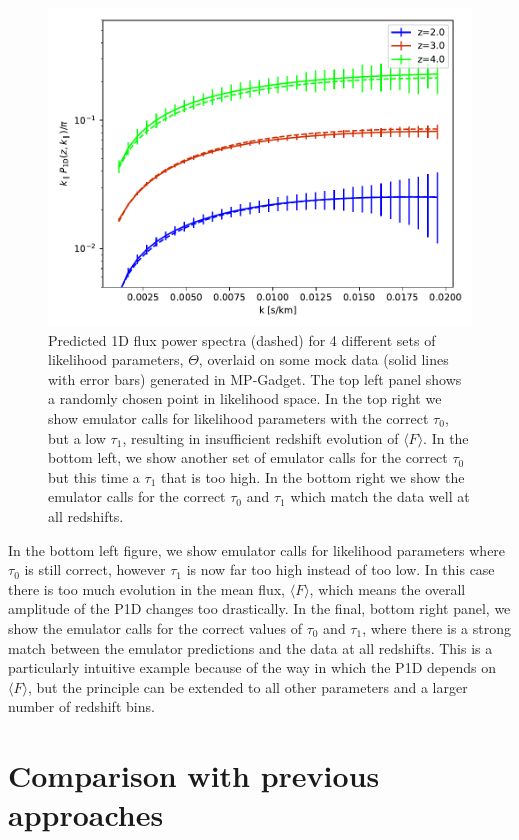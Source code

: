 \documentclass[]{article}
\begin{document}
\begin{figure}[h]
    \includegraphics[scale=0.4]{Figures/goodFit.pdf}
    \caption{Predicted 1D flux power spectra (dashed) for 4 different sets of likelihood
    parameters, $\Theta$, overlaid on some mock data (solid lines with error bars) generated
    in MP-Gadget.
    The top left panel shows a randomly chosen point in likelihood space. In the top
    right we show emulator calls for likelihood parameters with the correct $\tau_0$,
    but a low $\tau_1$, resulting in insufficient redshift evolution of $\langle F\rangle$.
    In the bottom left, we show another set of emulator calls for the correct $\tau_0$
    but this time a $\tau_1$ that is too high. In the bottom right we show the emulator
    calls for the correct $\tau_0$ and $\tau_1$ which match the data well at all redshifts.}
\end{figure}

\noindent In the bottom left figure, we show emulator calls for likelihood parameters
where $\tau_0$ is still correct, however $\tau_1$ is now far too high instead of too low.
In this case there is too much evolution in the mean flux, $\langle F\rangle$, which
means the overall amplitude of the P1D changes too drastically. In the final, bottom right
panel, we show the emulator calls for the correct values of $\tau_0$ and $\tau_1$, where
there is a strong match between the emulator predictions and the data at all redshifts.
This is a particularly intuitive example because of the way in which the P1D depends
on $\langle F\rangle$, but the principle can be extended to all other parameters and
a larger number of redshift bins.

\section{Comparison with previous approaches}
\end{document}
